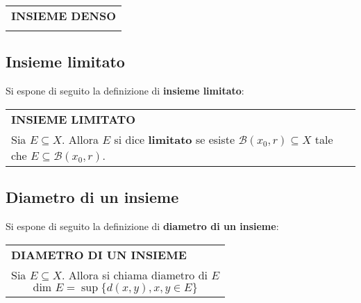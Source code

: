 \documentclass[a4paper]{extarticle}
\renewcommand\arraystretch{}
\begin{document}
\vspace{1em}
\setlength{\tabcolsep}{14pt}
\renewcommand{\arraystretch}{2}
\noindent
\begin{tabularx}{\textwidth}{@{}|P|@{}}
    \hline
    {\textbf{INSIEME DENSO}}\\
    \parbox{\linewidth}{
    \vspace{-1mm}}\\
    \hline
\end{tabularx}

\vspace{1em}
\noindent
\subsection{Insieme limitato}
Si espone di seguito la definizione di \textbf{insieme limitato}:

\vspace{1em}
\setlength{\tabcolsep}{14pt}
\renewcommand{\arraystretch}{2}
\noindent
\begin{tabularx}{\textwidth}{@{}|P|@{}}
    \hline
    {\textbf{INSIEME LIMITATO}}\\
    \parbox{\linewidth}{Sia $E \subseteq X$. Allora $E$ si dice \textbf{limitato} se esiste $\mathcal{B}(x_0,r) \subseteq X$ tale che $E \subseteq \mathcal{B}(x_0,r)$.
    \vspace{3mm}}\\
    \hline
\end{tabularx}

\vspace{1em}
\noindent
\subsection{Diametro di un insieme}
Si espone di seguito la definizione di \textbf{diametro di un insieme}:

\vspace{1em}
\setlength{\tabcolsep}{14pt}
\renewcommand{\arraystretch}{2}
\noindent
\begin{tabularx}{\textwidth}{@{}|P|@{}}
    \hline
    {\textbf{DIAMETRO DI UN INSIEME}}\\
    \parbox{\linewidth}{Sia $E \subseteq X$. Allora si chiama diametro di $E$
    \[\text{dim } E = \sup \{d(x,y), x,y \in E\}\]
    \vspace{-1mm}}\\
    \hline
\end{tabularx}
\end{document}
